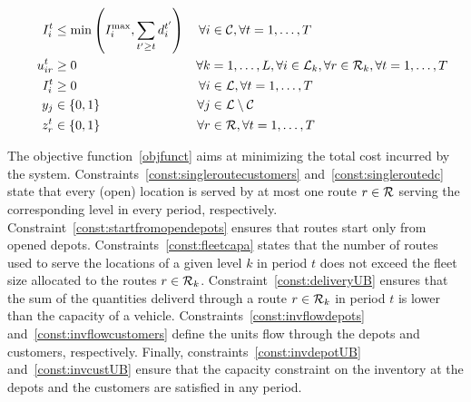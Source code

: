 \documentclass[10pt, a4paper]{article}
\begin{document}
\begin{alignat}{3}
    &&I^t_i 					&\leq \min\left(I_i^{\max}, \sum_{t'\geq t}d^{t'}_i\right)											&\forall i&\in \mathcal{C}, \forall t=1,\ldots,T\label{const:invcustUB}\\
    &&u^t_{ir}			&\geq 0 															&\forall k&=1,\ldots,L, \forall i\in \mathcal{L}_k, \forall r\in \mathcal{R}_k,\forall t=1,\ldots, T\label{const:upos}	\\
    &&I^t_{i}			&\geq 0 															&\forall i &\in \mathcal{L}, \forall t=1,\ldots, T\label{const:invCpos}	\\
    &&y_{j}					& \in \{0,1\} 														&\forall j&\in \mathcal{L}\setminus\mathcal{C}\label{const:ybool}\\	
    &&z^t_r					&\in \{0,1\} 														&\forall r&\in \mathcal{R}, \forall t=1,\ldots,T\label{const:zbool}
\end{alignat}

The objective function~\eqref{objfunct} aims at minimizing the total cost incurred by the system. 
Constraints~\eqref{const:singleroutecustomers} and~\eqref{const:singleroutedc} state that every (open) location is served by at most one route $r\in\mathcal{R}$ serving the corresponding level in every period, respectively. 
Constraint~\eqref{const:startfromopendepots} ensures that routes start only from opened depots. 
Constraints~\eqref{const:fleetcapa} states that the number of routes used to serve the locations of a given level $k$ in period $t$ does not exceed the fleet size allocated to the routes $r\in\mathcal{R}_k$.
Constraint~\eqref{const:deliveryUB} ensures that the sum of the quantities deliverd through a route $r\in\mathcal{R}_k$ in period $t$ is lower than the capacity of a vehicle. 
Constraints~\eqref{const:invflowdepots} and~\eqref{const:invflowcustomers} define the units flow through the depots and customers, respectively.
Finally, constraints~\eqref{const:invdepotUB} and~\eqref{const:invcustUB} ensure that the capacity constraint on the inventory at the depots and the customers are satisfied in any period. 
\end{document}
